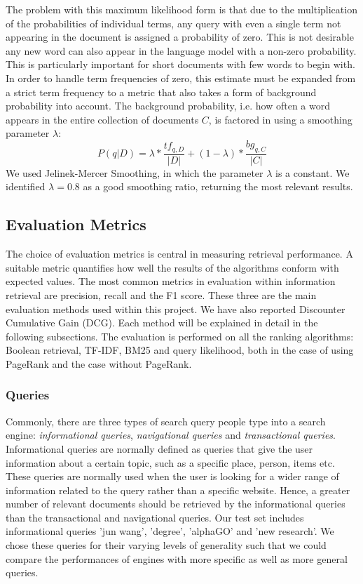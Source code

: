 The problem with this maximum likelihood form is that due to the multiplication of the probabilities of individual terms, any query with even a single term not appearing in the document is assigned a probability of zero. This is not desirable any new word can also appear in the language model with a non-zero probability. This is particularly important for short documents with few words to begin with. In order to handle term frequencies of zero, this estimate must be expanded from a strict term frequency to a metric that also takes a form of background probability into account. The background probability, i.e. how often a word appears in the entire collection of documents $C$, is factored in using a smoothing parameter $\lambda$:
\[P(q | D) = \lambda * \frac{tf_{q,D}}{|D|} + (1 - \lambda) * \frac{bg_{q,C}}{|C|}\]
We used Jelinek-Mercer Smoothing, in which the parameter $\lambda$ is a constant. We identified $\lambda = 0.8$ as a good smoothing ratio, returning the most relevant results.




\subsection{Evaluation Metrics} %
\label{sub:metrics_&_analysis}

The choice of evaluation metrics is central in measuring retrieval performance. A suitable metric quantifies how well the results of the algorithms conform with expected values. The most common metrics in evaluation within information retrieval are precision, recall and the F1 score. These three are the main evaluation methods used within this project. We have also reported Discounter Cumulative Gain (DCG). Each method will be explained in detail in the following subsections. The evaluation is performed on all the ranking algorithms: Boolean retrieval, TF-IDF, BM25 and query likelihood, both in the case of using PageRank and the case without PageRank.

\subsubsection{Queries}
Commonly, there are three types of search query people type into a search engine: \emph{informational queries}, \emph{navigational queries} and \emph{transactional queries}.
Informational queries are normally defined as queries that give the user information about a certain topic, such as a specific place, person, items etc. These queries are normally used when the user is looking for a wider range of information related to the query rather than a specific website. Hence, a greater number of relevant documents should be retrieved by the informational queries than the transactional and navigational queries. Our test set includes informational queries 'jun wang', 'degree', 'alphaGO' and 'new research'. We chose these queries for their varying levels of generality such that we could compare the performances of engines with more specific as well as more general queries.

